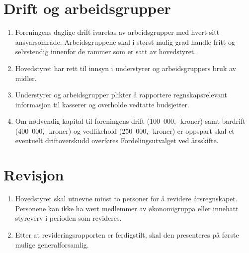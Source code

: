 \documentclass[8pt,norsk,a4paper]{article}
\begin{document}
\section{Drift og arbeidsgrupper}
\begin{enumerate}
	\item{Foreningens daglige drift ivaretas av arbeidsgrupper med hvert sitt ansvarsområde. Arbeidsgruppene skal i størst mulig grad handle fritt og selvstendig innenfor de rammer som er satt av hovedstyret.}
	\item{Hovedstyret har rett til innsyn i understyrer og arbeidsgruppers bruk av midler.}
	\item{Understyrer og arbeidsgrupper plikter å rapportere regnskapsrelevant informasjon til kasserer og overholde vedtatte budsjetter.}
	\item{Om nødvendig kapital til foreningens drift (100~000,- kroner) samt bardrift (400~000,- kroner) og vedlikehold (250~000,- kroner) er oppspart skal et eventuelt driftoverskudd overføres Fordelingsutvalget ved årsskifte.}
\end{enumerate}

\section{Revisjon}
\begin{enumerate}
	\item{Hovedstyret skal utnevne minst to personer for å revidere årsregnskapet. Personene kan ikke ha vært medlemmer av økonomigruppa eller innehatt styreverv i perioden som revideres.}
	\item{Etter at revideringsrapporten er ferdigstilt, skal den presenteres på første mulige generalforsamlig.}
\end{enumerate}
\end{document}
